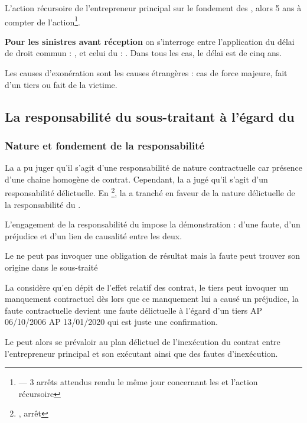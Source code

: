 			L’action récursoire de l’entrepreneur principal sur le fondement des \TAV, alors 5 ans à compter de l’action\footnote{ --- 3 arrêts attendus rendu le même jour concernant les \TAV et l'action récursoire}.


			\textbf{Pour les sinistres avant réception} on s’interroge entre l’application du délai de droit commun : , et celui du \ccom : . Dans tous les cas, le délai est de cinq ans.

			Les causes d’exonération sont les causes étrangères\label{causesEtrangeres} : cas de force majeure, fait d’un tiers ou fait de la victime.



	\subsection{La responsabilité du sous-traitant à l'égard du \Mo}

		\subsubsection{Nature et fondement de la responsabilité}

			La \civUn a pu juger qu'il s'agit d'une responsabilité de nature contractuelle car présence d'une chaine homogène de contrat. Cependant, la \civTrois a jugé qu'il s'agit d'un responsabilité délictuelle. En \assPlen\footnote{, arrêt }, la \CourDeCas a tranché en faveur de la nature délictuelle de la responsabilité du \ST.

			L’engagement de la responsabilité du \ST impose la démonstration : d’une faute, d’un préjudice et d’un lien de causalité entre les deux.

			Le \MO ne peut pas invoquer une obligation de résultat mais la faute peut trouver son origine dans le sous-traité

			La \CourDeCas considère qu’en dépit de l’effet relatif des contrat, le tiers peut invoquer un manquement contractuel dès lors que ce manquement lui a causé un préjudice, la faute contractuelle devient une faute délictuelle à l’égard d’un tiers AP 06/10/2006 AP 13/01/2020 qui est juste une confirmation.


			Le \MO peut alors se prévaloir au plan délictuel de l’inexécution du contrat entre l’entrepreneur principal et son exécutant ainsi que des fautes d’inexécution.

